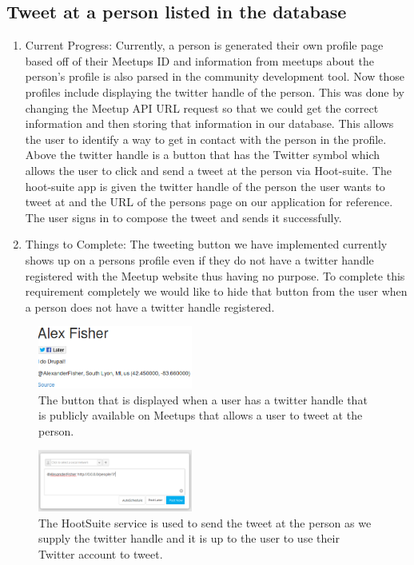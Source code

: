 \documentclass[letterpaper,10pt,onecolumn]{IEEEtran} %
\begin{document}
\subsection{Tweet at a person listed in the database}
\begin{enumerate}[label*=\arabic*.]
\item Current Progress: Currently, a person is generated their own profile page based off of their Meetups ID and information from meetups about the person’s profile is also parsed in the community development tool. Now those profiles include displaying the twitter handle of the person. This was done by changing the Meetup API URL request so that we could get the correct information and then storing that information in our database. This allows the user to identify a way to get in contact with the person in the profile. Above the twitter handle is a button that has the Twitter symbol which allows the user to click and send a tweet at the person via Hoot-suite. The hoot-suite app is given the twitter handle of the person the user wants to tweet at and the URL of the persons page on our application for reference. The user signs in to compose the tweet and sends it successfully.

\item Things to Complete: The tweeting button we have implemented currently shows up on a persons profile even if they do not have a twitter handle registered with the Meetup website thus having no purpose. To complete this requirement completely we would like to hide that button from the user when a person does not have a twitter handle registered.
\end{enumerate}

\begin{figure}[htp]
  \begin{center}
  
  \includegraphics[width=2in]{tweet_person1}
  \centering
  \caption{The button that is displayed when a user has a twitter handle that is publicly available on Meetups that allows a user to tweet at the person.}

  \end{center}
\end{figure}

\begin{figure}[htp]
  \begin{center}
  
  \includegraphics[width=2in]{tweet_person2}
  \centering
  \caption{The HootSuite service is used to send the tweet at the person as we supply the twitter handle and it is up to the user to use their Twitter account to tweet.}

  \end{center}
\end{figure}
\end{document}
